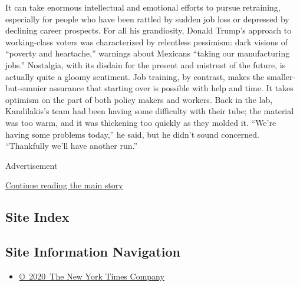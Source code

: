 It can take enormous intellectual and emotional efforts to pursue
retraining, especially for people who have been rattled by sudden job
loss or depressed by declining career prospects. For all his
grandiosity, Donald Trump's approach to working-class voters was
characterized by relentless pessimism: dark visions of ``poverty and
heartache,'' warnings about Mexicans ``taking our manufacturing jobs.''
Nostalgia, with its disdain for the present and mistrust of the future,
is actually quite a gloomy sentiment. Job training, by contrast, makes
the smaller-but-sunnier assurance that starting over is possible with
help and time. It takes optimism on the part of both policy makers and
workers. Back in the lab, Kandilakis's team had been having some
difficulty with their tube; the material was too warm, and it was
thickening too quickly as they molded it. ``We're having some problems
today,'' he said, but he didn't sound concerned. ``Thankfully we'll have
another run.''

Advertisement

\protect\hyperlink{after-bottom}{Continue reading the main story}

\hypertarget{site-index}{%
\subsection{Site Index}\label{site-index}}

\hypertarget{site-information-navigation}{%
\subsection{Site Information
Navigation}\label{site-information-navigation}}

\begin{itemize}
\tightlist
\item
  \href{https://help.nytimes3xbfgragh.onion/hc/en-us/articles/115014792127-Copyright-notice}{©~2020~The
  New York Times Company}
\end{itemize}

